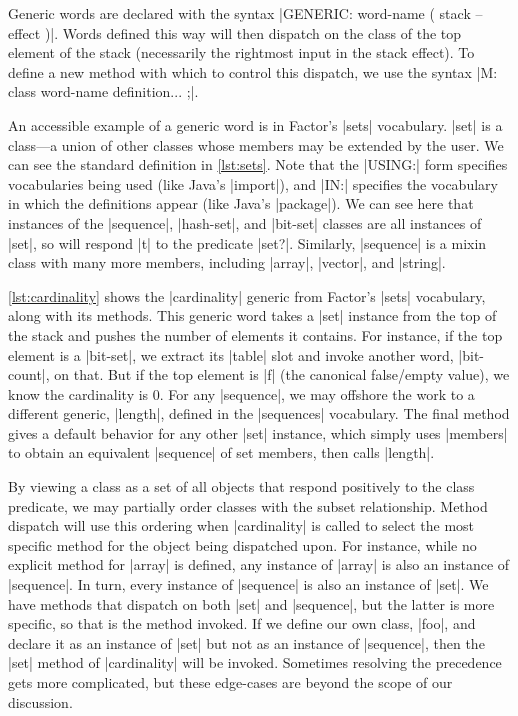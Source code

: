 Generic words are declared with the syntax
%
\factor|GENERIC: word-name ( stack -- effect )|.
%
Words defined this way will then dispatch on the class of the top element of
the stack (necessarily the rightmost input in the stack effect).  To define a
new method with which to control this dispatch, we use the syntax
%
\factor|M: class word-name definition... ;|.


An accessible example of a generic word is in Factor's \factor|sets|
vocabulary.  \factor|set| is a  class---a union of other classes
whose members may be extended by the user.  We can see the standard definition
in \vref{lst:sets}.  Note that the \factor|USING:| form specifies vocabularies
being used (like Java's |import|), and \factor|IN:| specifies the
vocabulary in which the definitions appear (like Java's |package|).
We can see here that instances of the \factor|sequence|, \factor|hash-set|, and
\factor|bit-set| classes are all instances of \factor|set|, so will respond
\factor|t| to the predicate \factor|set?|.  Similarly, \factor|sequence| is a
mixin class with many more members, including \factor|array|, \factor|vector|,
and \factor|string|.


\vref{lst:cardinality} shows the \factor|cardinality| generic from Factor's
\factor|sets| vocabulary, along with its methods.  This generic word takes a
\factor|set| instance from the top of the stack and pushes the number of
elements it contains.  For instance, if the top element is a \factor|bit-set|,
we extract its \factor|table| slot and invoke another word, \factor|bit-count|,
on that.  But if the top element is \factor|f| (the canonical false/empty
value), we know the cardinality is $0$.  For any \factor|sequence|, we may
offshore the work to a different generic, \factor|length|, defined in the
\factor|sequences| vocabulary.  The final method gives a default behavior for
any other \factor|set| instance, which simply uses \factor|members| to obtain
an equivalent \factor|sequence| of set members, then calls \factor|length|.

By viewing a class as a set of all objects that respond positively to the class
predicate, we may partially order classes with the subset relationship.  Method
dispatch will use this ordering when \factor|cardinality| is called to select
the most specific method for the object being dispatched upon.  For instance,
while no explicit method for \factor|array| is defined, any instance of
\factor|array| is also an instance of \factor|sequence|.  In turn, every
instance of \factor|sequence| is also an instance of \factor|set|.  We have
methods that dispatch on both \factor|set| and \factor|sequence|, but the
latter is more specific, so that is the method invoked.  If we define our own
class, \factor|foo|, and declare it as an instance of \factor|set| but not as
an instance of \factor|sequence|, then the \factor|set| method of
\factor|cardinality| will be invoked.  Sometimes resolving the precedence gets
more complicated, but these edge-cases are beyond the scope of our discussion.

